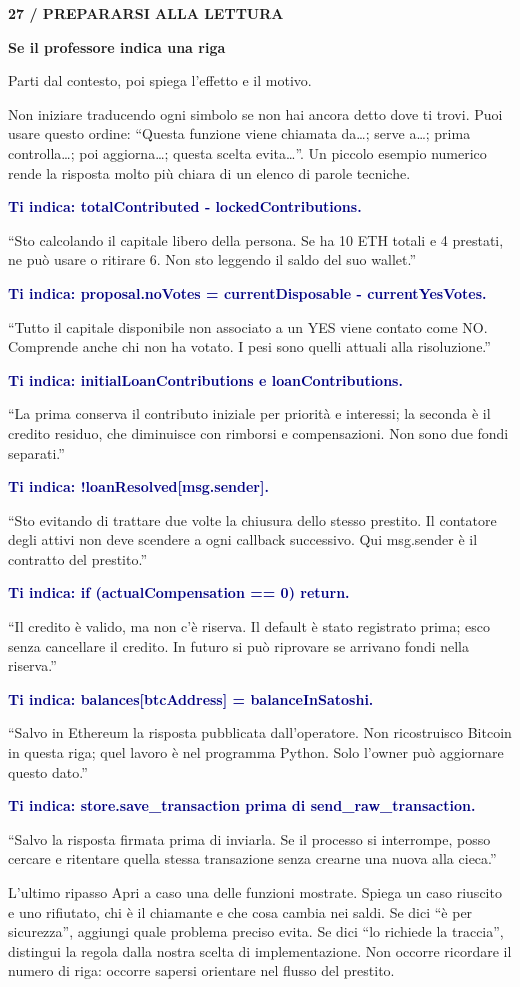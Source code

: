 \documentclass[10pt,a4paper]{article}
\newcounter{guidechapter}
\newcommand{\chapterpage}[3]{\clearpage
  \stepcounter{guidechapter}\pdfbookmark[0]{#2}{chapter\theguidechapter}
  {\small\bfseries\color{Teal}#1\par}\vspace{1mm}
  {\fontsize{24}{28}\selectfont\bfseries\color{Navy}#2\par}\vspace{2mm}
  {\color{Muted}#3\par}\vspace{3mm}}
\newcommand{\qa}[2]{\par\vspace{1mm}\textbf{\textcolor{Navy}{#1}}\par #2\par}
\begin{document}
\chapterpage{27 / PREPARARSI ALLA LETTURA}{Se il professore indica una riga}{Parti dal contesto, poi spiega l'effetto e il motivo.}
Non iniziare traducendo ogni simbolo se non hai ancora detto dove ti trovi.
Puoi usare questo ordine: ``Questa funzione viene chiamata da\ldots;
serve a\ldots; prima controlla\ldots; poi aggiorna\ldots;
questa scelta evita\ldots''. Un piccolo esempio numerico rende la risposta
molto più chiara di un elenco di parole tecniche.

\qa{Ti indica: totalContributed - lockedContributions.}{``Sto calcolando il
capitale libero della persona. Se ha 10 ETH totali e 4 prestati, ne può
usare o ritirare 6. Non sto leggendo il saldo del suo wallet.''}

\qa{Ti indica: proposal.noVotes = currentDisposable - currentYesVotes.}{``Tutto
il capitale disponibile non associato a un YES viene contato come NO.
Comprende anche chi non ha votato. I pesi sono quelli attuali alla risoluzione.''}

\qa{Ti indica: initialLoanContributions e loanContributions.}{``La prima conserva
il contributo iniziale per priorità e interessi; la seconda è il credito
residuo, che diminuisce con rimborsi e compensazioni. Non sono due fondi separati.''}

\qa{Ti indica: !loanResolved[msg.sender].}{``Sto evitando di trattare due volte
la chiusura dello stesso prestito. Il contatore degli attivi non deve scendere
a ogni callback successivo. Qui msg.sender è il contratto del prestito.''}

\qa{Ti indica: if (actualCompensation == 0) return.}{``Il credito è valido, ma
non c'è riserva. Il default è stato registrato prima; esco senza cancellare il
credito. In futuro si può riprovare se arrivano fondi nella riserva.''}

\qa{Ti indica: balances[btcAddress] = balanceInSatoshi.}{``Salvo in Ethereum
la risposta pubblicata dall'operatore. Non ricostruisco Bitcoin in questa riga;
quel lavoro è nel programma Python. Solo l'owner può aggiornare questo dato.''}

\qa{Ti indica: store.save\_transaction prima di send\_raw\_transaction.}{``Salvo la
risposta firmata prima di inviarla. Se il processo si interrompe, posso cercare
e ritentare quella stessa transazione senza crearne una nuova alla cieca.''}

\begin{keybox}{L'ultimo ripasso}
Apri a caso una delle funzioni mostrate. Spiega un caso riuscito e uno rifiutato,
chi è il chiamante e che cosa cambia nei saldi. Se dici ``è per sicurezza'',
aggiungi quale problema preciso evita. Se dici ``lo richiede la traccia'',
distingui la regola dalla nostra scelta di implementazione. Non occorre ricordare
il numero di riga: occorre sapersi orientare nel flusso del prestito.
\end{keybox}
\end{document}
